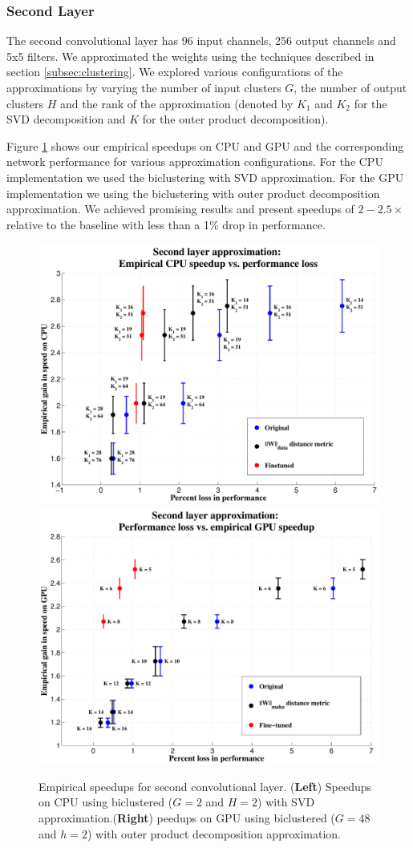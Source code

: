 \subsubsection{Second Layer}
The second convolutional layer has 96 input channels, 256 output channels and 5x5 filters. 
We approximated the weights using the techniques described in section \ref{subsec:clustering}. 
We explored various configurations of the approximations by varying the number of input clusters $G$, the number of output clusters $H$ and the rank of the approximation (denoted by $K_1$ and $K_2$ for the SVD decomposition and $K$ for the outer product decomposition). 

Figure \ref{fig:biclust_speedups} shows our empirical speedups on CPU
and GPU and the corresponding network performance for
various approximation configurations. For the CPU implementation we used the biclustering with SVD approximation. For the GPU implementation we using the biclustering with outer product decomposition approximation.  
We achieved promising results and present speedups of $2-2.5\times$ relative to the baseline with less than a 1\% drop in performance.

\begin{figure}[t]
\centering
\begin{minipage}{0.9\textwidth}
      \includegraphics[width=0.5\linewidth]{img/layer2_CPUspeedup_vs_performance_loss_finetune_and_orig.pdf}
      \quad
      \includegraphics[width=0.5\linewidth]{img/layer2_GPUspeedup_vs_performance_loss_finetune_and_orig.pdf}
\end{minipage}
\caption{Empirical speedups for second convolutional layer. ({\bf Left}) Speedups on CPU using biclustered ($G = 2$ and $H = 2$) with SVD approximation.({\bf Right}) peedups on GPU using biclustered ($G = 48$ and $h = 2$) with outer product decomposition approximation.}
\label{fig:biclust_speedups}
\end{figure}

